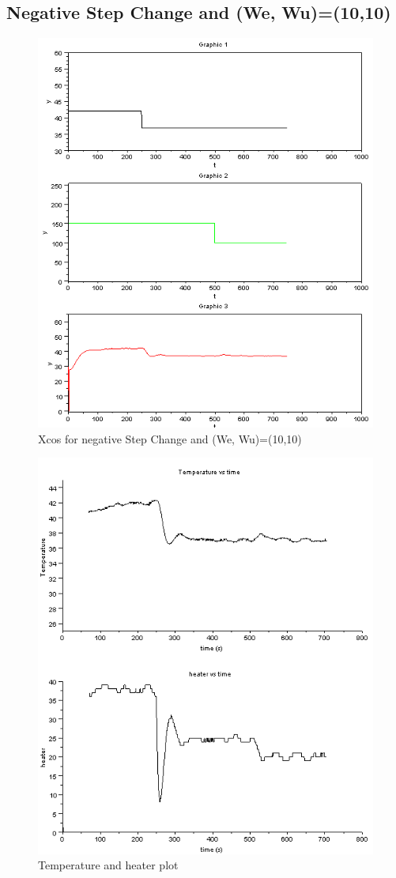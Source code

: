 \subsection{Negative Step Change and (We, Wu)=(10,10)}
\begin{figure}[H]
\centering
  \includegraphics[width=0.8\linewidth]{mpc/2_2.PNG}
  \caption{Xcos for negative Step Change and (We, Wu)=(10,10)}
\end{figure}
\begin{figure}[H]
\centering
  \includegraphics[width=0.8\linewidth]{mpc/2_2_heater_final.png}
  \caption{Temperature and heater plot}
\end{figure}


